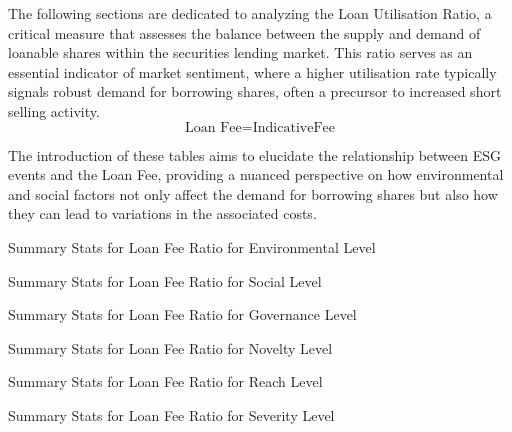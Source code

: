 The following sections are dedicated to analyzing the Loan Utilisation Ratio, a critical measure that assesses the balance between the supply and demand of loanable shares within the securities lending market. This ratio serves as an essential indicator of market sentiment, where a higher utilisation rate typically signals robust demand for borrowing shares, often a precursor to increased short selling activity.
 \begin{equation}
	\text{Loan Fee} = \text{IndicativeFee}
	\label{eq:Loan_Fee}
\end{equation}

The introduction of these tables aims to elucidate the relationship between ESG events and the Loan Fee, providing a nuanced perspective on how environmental and social factors not only affect the demand for borrowing shares but also how they can lead to variations in the associated costs.

\begin{table}[H]
\caption{Summary Stats for Loan Fee Ratio for Environmental Level}
\centering

\label{table:loan_fee_environment.tex}
\end{table}

\begin{table}[H]
\caption{Summary Stats for Loan Fee Ratio for Social Level}
\centering

\label{table:loan_fee_social.tex}
\end{table}

\begin{table}[H]
\caption{Summary Stats for Loan Fee Ratio for Governance Level}
\centering

\label{table:loan_fee_governance.tex}
\end{table}


\begin{table}[H]
\caption{Summary Stats for Loan Fee Ratio for Novelty Level}
\centering

\label{table:loan_fee_novelty.tex}
\end{table}

\begin{table}[H]
\caption{Summary Stats for Loan Fee Ratio for Reach Level}
\centering

\label{table:loan_fee_reach.tex}
\end{table}

\begin{table}[H]
\caption{Summary Stats for Loan Fee Ratio for Severity Level}
\centering

\label{table:loan_fee_severity.tex}
\end{table}




